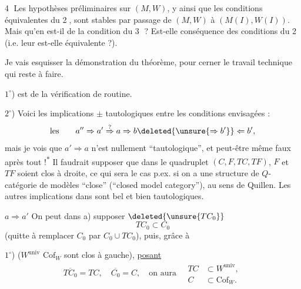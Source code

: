 \textcircled{4} Les hypothèses préliminaires sur $(M,W)$, y
ainsi que les conditions équivalentes du \textcircled{2},
sont stables par passage de $(M,W)$ à
$(M(I),W(I))$. Mais qu'en est-il de la
condition du \textcircled{3} ? Est-elle conséquence
des conditions du \textcircled{2} (i.e. leur est-elle
équivalente ?).

Je vais esquisser la démonstration du
théorème, pour cerner le travail technique
qui reste à faire.

$1^\circ$) est de la vérification de routine.

$2^\circ$) Voici les implications $\pm$ tautologiques
entre les conditions envisagées :
\[
 \text{les}\qquad a''\Rightarrow a'\overset{?}{\Rightarrow}a\Rightarrow b\deleted{\unsure{\Rightarrow b'}}\Leftarrow b',
\]
mais je vois que $a'\Rightarrow a$ n'est  nullement
``tautologique'', et peut-être même faux
après tout !\textsuperscript{$*$} Il faudrait supposer que dans
le quadruplet $(C,F,TC,TF)$, $F$ et $TF$ soient clos
à droite,  ce qui sera le cas p.ex. si
on a une structure de $Q$-catégorie de
modèles ``close'' (``closed model category''), au
sens de Quillen. Les autres  implications dans
\unsure{(*)} sont bel et bien tautologiques.

$a\Rightarrow a'$ On peut dans a) supposer $\deleted{\unsure{TC_0}}$
\[
 TC_0\subset C_0
\]
(quitte à remplacer $C_0$ par $C_0\cup TC_0$), puis, grâce à

$1^\circ$) ($W^{\mathrm{univ}}$  $\mathrm{Cof}_W$ sont clos à gauche), \uline{posant}
\[
 \overline{TC_0}=TC,\quad \overline{C_0}=C,\quad \text{on aura}\quad
 \begin{aligned}TC&\subset W^{\mathrm{univ}},\\ C&\subset\mathrm{Cof}_W.\end{aligned}
\]


